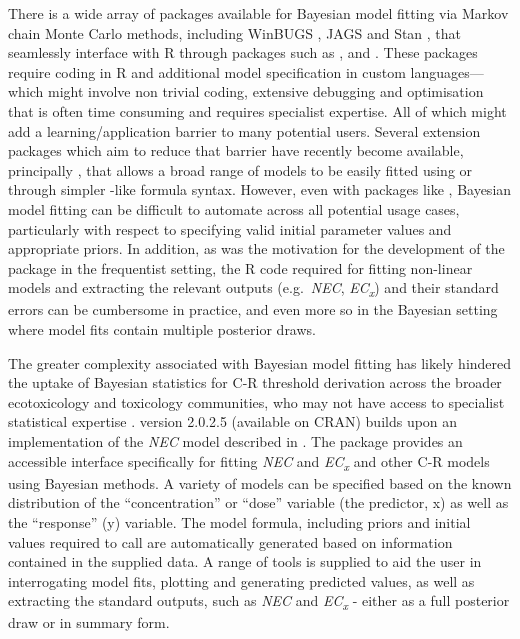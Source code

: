 \documentclass[
  shortnames]{jss}
\begin{document}
There is a wide array of packages available for Bayesian model fitting via Markov chain Monte Carlo methods, including WinBUGS \citep{Lunn2000}, JAGS \citep{Plummer2003} and Stan \citep{Carpenter2017}, that seamlessly interface with R through packages such as ,  \citep{Su2015} and  \citep{rstan2021}. These packages require coding in R and additional model specification in custom languages---which might involve non trivial coding, extensive debugging and optimisation that is often time consuming and requires specialist expertise. All of which might add a learning/application barrier to many potential users. Several extension packages which aim to reduce that barrier have recently become available, principally  \citep{Burkner2017}, that allows a broad range of models to be easily fitted using \citep{rstan2021} or  \citep{cmdstanr2022} through simpler -like formula syntax. However, even with packages like , Bayesian model fitting can be difficult to automate across all potential usage cases, particularly with respect to specifying valid initial parameter values and appropriate priors. In addition, as was the motivation for the development of the  package in the frequentist setting, the R code required for fitting non-linear models and extracting the relevant outputs (e.g.~\emph{NEC}, \emph{EC\textsubscript{x}}) and their standard errors can be cumbersome in practice, and even more so in the Bayesian setting where model fits contain multiple posterior draws.

The greater complexity associated with Bayesian model fitting has likely hindered the uptake of Bayesian statistics for C-R threshold derivation across the broader ecotoxicology and toxicology communities, who may not have access to specialist statistical expertise \citep{Fisher2019}.  version 2.0.2.5 (available on CRAN) builds upon an implementation of the \emph{NEC} model described in \citep{Fox2010, Pires2002}. The  package provides an accessible interface specifically for fitting \emph{NEC} and \emph{EC\textsubscript{x}} and other C-R models using Bayesian methods. A variety of models can be specified based on the known distribution of the ``concentration'' or ``dose'' variable (the predictor, x) as well as the ``response'' (y) variable. The model formula, including priors and initial values required to call  are automatically generated based on information contained in the supplied data. A range of tools is supplied to aid the user in interrogating model fits, plotting and generating predicted values, as well as extracting the standard outputs, such as \emph{NEC} and \emph{EC\textsubscript{x}} - either as a full posterior draw or in summary form.
\end{document}
